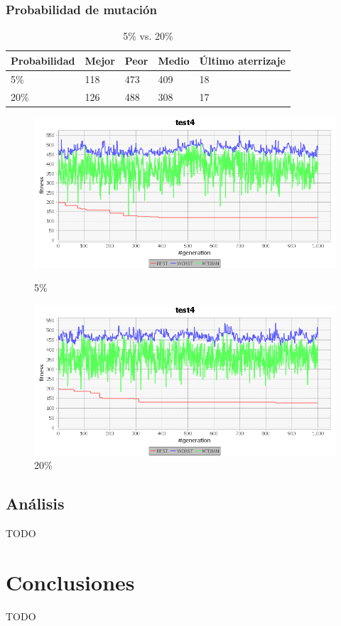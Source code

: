 \documentclass[a4paper,12pt,titlepage]{article}
\begin{document}
\newpage

\subsubsection{Probabilidad de mutación}

\begin{table}[!ht]
\centering
\begin{tabular}{@{}lllll@{}}
\toprule
Probabilidad & Mejor & Peor & Medio & Último aterrizaje \\ \midrule
5\%          & 118   & 473  & 409   & 18                \\
20\%         & 126   & 488  & 308   & 17                \\ \bottomrule
\end{tabular}
\caption{5\% vs. 20\%}
\end{table}

\begin{figure}[!ht]
\centering
\begin{minipage}{.5\textwidth}
  \centering
  \includegraphics[width=\textwidth]{5mut.png}
  \caption{5\%}
\end{minipage}%
\begin{minipage}{.5\textwidth}
  \centering
  \includegraphics[width=\textwidth]{20mut.png}
  \caption{20\%}
\end{minipage}
\end{figure}

\subsection{Análisis}

TODO

\section{Conclusiones}

TODO

\newpage


\end{document}
